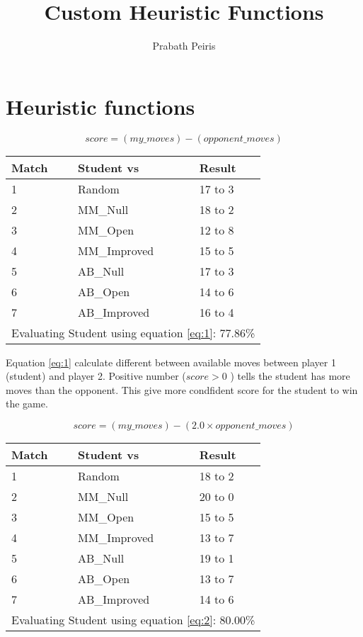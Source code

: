 \documentclass{article}
\begin{document}
\author{Prabath Peiris}
\title{Custom Heuristic Functions}
\date{}
\maketitle

\section*{Heuristic functions}

\begin{equation}
score = (my\_moves) - (opponent\_moves)
\label{eq:1}
\end{equation}

\begin{center}
\begin{tabular}{|l|l|l|} \hline
	Match & Student vs & Result \\ \hline
	1 & Random & 17 to 3 \\
	2 & MM\_Null & 18 to 2 \\
	3 & MM\_Open & 12 to 8 \\
	4 & MM\_Improved & 15 to 5 \\
	5 & AB\_Null & 17 to 3 \\
	6 & AB\_Open & 14 to 6 \\
	7 & AB\_Improved & 16 to 4 \\ \hline\hline
	\multicolumn{3}{|l|}{Evaluating Student using equation \ref{eq:1}: 77.86\% } \\ \hline
\end{tabular}
\end{center}

Equation \ref{eq:1} calculate different between available moves between player 1 (student) and player 2. Positive number ($score > 0 $ ) tells the student has more moves than the opponent. This give more condfident score for the student to win the game.


\begin{equation}
score = (my\_moves) - (2.0 \times opponent\_moves)
\label{eq:2}
\end{equation}

\begin{center}
\begin{tabular}{|l|l|l|} \hline
	Match & Student vs & Result \\ \hline
	1 & Random & 18 to 2 \\
	2 & MM\_Null & 20 to 0 \\
	3 & MM\_Open & 15 to 5 \\
	4 & MM\_Improved & 13 to 7 \\
	5 & AB\_Null & 19 to 1 \\
	6 & AB\_Open & 13 to 7 \\
	7 & AB\_Improved & 14 to 6 \\ \hline\hline
	\multicolumn{3}{|l|}{Evaluating Student using equation \ref{eq:2}: 80.00\% } \\ \hline
\end{tabular}
\end{center}
\end{document}
